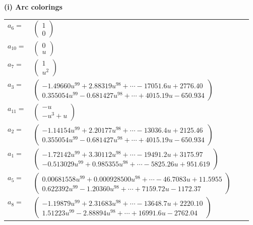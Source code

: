 \documentclass[1p]{elsarticle_modified}
\theoremstyle{definition}
\begin{document}
\flushleft \textbf{(i) Arc colorings}\\
\begin{tabular}{m{7pt} m{180pt} m{7pt} m{180pt} }
\flushright $a_{6}=$&$\begin{pmatrix}1\\0\end{pmatrix}$ \\
\flushright $a_{10}=$&$\begin{pmatrix}0\\u\end{pmatrix}$ \\
\flushright $a_{7}=$&$\begin{pmatrix}1\\u^2\end{pmatrix}$ \\
\flushright $a_{3}=$&$\begin{pmatrix}-1.49660 u^{99}+2.88319 u^{98}+\cdots-17051.6 u+2776.40\\0.355054 u^{99}-0.681427 u^{98}+\cdots+4015.19 u-650.934\end{pmatrix}$ \\
\flushright $a_{11}=$&$\begin{pmatrix}- u\\- u^3+u\end{pmatrix}$ \\
\flushright $a_{2}=$&$\begin{pmatrix}-1.14154 u^{99}+2.20177 u^{98}+\cdots-13036.4 u+2125.46\\0.355054 u^{99}-0.681427 u^{98}+\cdots+4015.19 u-650.934\end{pmatrix}$ \\
\flushright $a_{1}=$&$\begin{pmatrix}-1.72142 u^{99}+3.30112 u^{98}+\cdots-19491.2 u+3175.97\\-0.513029 u^{99}+0.985355 u^{98}+\cdots-5825.26 u+951.619\end{pmatrix}$ \\
\flushright $a_{5}=$&$\begin{pmatrix}0.00681558 u^{99}+0.000928500 u^{98}+\cdots-46.7083 u+11.5955\\0.622392 u^{99}-1.20360 u^{98}+\cdots+7159.72 u-1172.37\end{pmatrix}$ \\
\flushright $a_{8}=$&$\begin{pmatrix}-1.19879 u^{99}+2.31683 u^{98}+\cdots-13648.7 u+2220.10\\1.51223 u^{99}-2.88894 u^{98}+\cdots+16991.6 u-2762.04\end{pmatrix}$ \\

\end{tabular}
\end{document}
